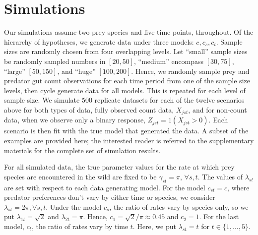 \section{Simulations}
\label{sec:sim}


Our simulations assume two prey species and five time points, throughout.  Of the hierarchy of hypotheses, we generate data under three models: $c, c_s, c_t$.  Sample sizes are randomly chosen from four overlapping levels.  Let ``small'' sample sizes be randomly sampled numbers in $[20,50]$, ``medium'' encompass $[30,75]$, ``large'' $[50,150]$, and ``huge'' $[100,200]$.  Hence, we randomly sample prey and predator gut count observations for each time period from one of the sample size levels, then cycle generate data for all models.  This is repeated for each level of sample size.  We simulate $500$ replicate datasets for each of the twelve scenarios above for both types of data, fully observed count data, $X_{jst}$, and for non-count data, when we observe only a binary response, $Z_{jst} = 1(X_{jst}>0)$.  Each scenario is then fit with the true model that generated the data.  A subset of the examples are provided here; the interested reader is referred to the supplementary materials for the complete set of simulation results.

For all simulated data, the true parameter values for the rate at which prey species are encountered in the wild are fixed to be $\gamma_{st} = \pi, \, \forall s,t$. The values of $\lambda_{st}$ are set with respect to each data generating model.  For the model $c_{st} = c$, where predator preferences don't vary by either time or species, we consider $\lambda_{st} = 2\pi, \forall s,t$.  Under the model $c_s$, the ratio of rates vary by species only, so we put $\lambda_{1t} = \sqrt{2}$ and $\lambda_{2t} = \pi$.  Hence, $c_1 = \sqrt{2}/\pi \approx 0.45$ and $c_2 = 1$.  For the last model, $c_t$, the ratio of rates vary by time $t$.  Here, we put $\lambda_{st} = t$ for $t \in \{1, \ldots, 5 \}$.  

